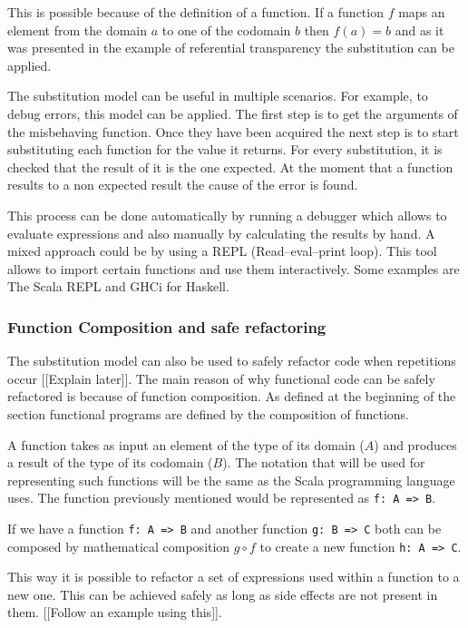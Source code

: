\documentclass[../main.tex]{subfiles}
\begin{document}
This is possible because of the definition of a function. If a function $f$ maps an
element from the domain $a$ to one of the codomain $b$ then $f(a) = b$ and as it
was presented in the example of referential transparency the substitution can be
applied.

The substitution model can be useful in multiple scenarios. For example, to
debug errors, this model can be applied. The first step is to get the arguments
of the misbehaving function. Once they have been acquired the next step is to
start substituting each function for the value it returns. For every
substitution, it is checked that the result of it is the one expected. At the
moment that a function results to a non expected result the cause of the error
is found.

This process can be done automatically by running a debugger which allows to
evaluate expressions and also manually by calculating the results by hand. A
mixed approach could be by using a REPL (Read–eval–print loop). This tool allows
to import certain functions and use them interactively. Some examples are The
Scala REPL and GHCi for Haskell.

\subsubsection{Function Composition and safe refactoring} The substitution model
can also be used to safely refactor code when repetitions occur [[Explain
later]]. The main reason of why functional code can be safely refactored is
because of function composition. As defined at the beginning of the section
functional programs are defined by the composition of functions.

A function takes as input an element of the type of its domain ($A$) and
produces a result of the type of its codomain ($B$). The notation that will be
used for representing such functions will be the same as the Scala programming
language uses. The function previously mentioned would be represented as
\texttt{f: A => B}.

If we have a function \texttt{f: A => B} and another function \texttt{g: B => C}
both can be composed by mathematical composition $g \circ f$ to create a new
function \texttt{h: A => C}.

This way it is possible to refactor a set of expressions used within a function
to a new one. This can be achieved safely as long as side effects are not
present in them. [[Follow an example using this]].
\end{document}
